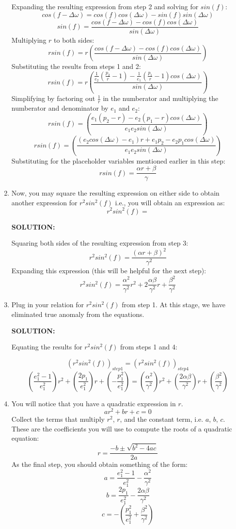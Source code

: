 \documentclass[12pt, letterpaper]{aiaa-tc}
\begin{document}
\begin{enumerate}
    Expanding the resulting expression from step 2 and solving for $sin(f)$:
    \[ cos(f-\Delta\omega)=cos(f)cos(\Delta\omega)-sin(f)sin(\Delta\omega) \]
    \[ sin(f)=\frac{cos(f-\Delta\omega)-cos(f)cos(\Delta\omega)}{sin(\Delta\omega)} \]
    Multiplying $r$ to both sides:
    \[ rsin(f)=r\left(\frac{cos(f-\Delta\omega)-cos(f)cos(\Delta\omega)}{sin(\Delta\omega)}\right) \]
    Substituting the results from steps 1 and 2:
    \[ rsin(f)=r\left(\frac{\frac{1}{e_2}\left (\frac{p_2}{r}-1 \right)-\frac{1}{e_1}\left (\frac{p_1}{r}-1 \right)cos(\Delta\omega)}{sin(\Delta\omega)}\right) \]
    Simplifying by factoring out $\frac{1}{r}$ in the numberator and multiplying the numberator and denominator by $e_1$ and $e_2$:
    \[ rsin(f)=\left(\frac{e_1(p_2-r)-e_2(p_1-r)cos(\Delta\omega)}{e_1e_2sin(\Delta\omega)}\right) \]
    \[ rsin(f)=\left(\frac{(e_2cos(\Delta\omega)-e_1)r+e_1p_2-e_2p_1cos(\Delta\omega)}{e_1e_2sin(\Delta\omega)}\right) \]
    Substituting for the placeholder variables mentioned earlier in this step:
    \[ rsin(f)=\frac{\alpha r+\beta}{\gamma} \]

    \item Now, you may square the resulting expression on either side to obtain another expression for 
    $r^2sin^2(f)$ i.e., you will obtain an expression as:
    \[r^2sin^2(f)= \]
    
    \textbf{SOLUTION:}
    
    Squaring both sides of the resulting expression from step 3:
    \[ r^2sin^2(f)=\frac{(\alpha r+\beta)^2}{\gamma^2} \]
    Expanding this expression (this will be helpful for the next step):
    \[ r^2sin^2(f)=\frac{\alpha^2}{\gamma^2}r^2+2\frac{\alpha\beta}{\gamma^2}r+\frac{\beta^2}{\gamma^2} \]

    \item  Plug in your relation for $r^2sin^2(f)$ from step 1. At this stage, we have eliminated true anomaly from the equations.

    \textbf{SOLUTION:}

    Equating the results for $r^2sin^2(f)$ from steps 1 and 4:
    
    \[ \left(r^2sin^2(f)\right)_{step 1}=\left(r^2sin^2(f)\right)_{step 4} \]
    \[ \left(\frac{e_1^2-1}{e_1^2}\right)r^2+\left(\frac{2p_1}{e_1^2}\right)r+\left(-\frac{p_1^2}{e_1^2}\right)=\left(\frac{\alpha^2}{\gamma^2}\right)r^2+\left(\frac{2\alpha\beta}{\gamma^2}\right)r+\left(\frac{\beta^2}{\gamma^2}\right) \]
    
    \item You will notice that you have a quadratic expression in $r$.
    \[ ar^2+br+c=0 \]
    Collect the terms that multiply $r^2$, $r$, and the constant term, i.e. $a$, $b$, $c$. These are the coefficients you will
    use to compute the roots of a quadratic equation:
    \[ r=\frac{-b\pm\sqrt{b^2-4ac}}{2a} \]
    As the final step, you should obtain something of the form:
    \[ a=\frac{e_1^2-1}{e_1^2}-\frac{\alpha^2}{\gamma^2} \]
    \[ b=\frac{2p_1}{e_1^2}-\frac{2\alpha\beta}{\gamma^2} \]
    \[ c=-\left(\frac{p_1^2}{e_1^2}+\frac{\beta^2}{\gamma^2}\right) \]


\end{enumerate}
\end{document}
